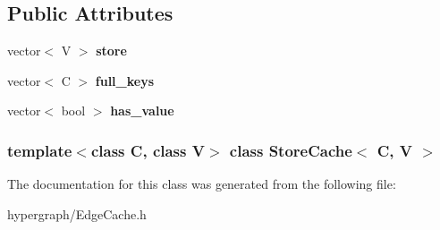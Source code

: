\subsection*{Public Attributes}
\begin{DoxyCompactItemize}
\item 
\hypertarget{class_store_cache_a99393733357e04fe79cf703d3f4d8f44}{
vector$<$ V $>$ {\bfseries store}}
\label{class_store_cache_a99393733357e04fe79cf703d3f4d8f44}

\item 
\hypertarget{class_store_cache_a0df08d5576ce34c4a8fd4f7428fd9ad3}{
vector$<$ C $>$ {\bfseries full\_\-keys}}
\label{class_store_cache_a0df08d5576ce34c4a8fd4f7428fd9ad3}

\item 
\hypertarget{class_store_cache_acdfad2c43fd63e37fbb818ce282f6493}{
vector$<$ bool $>$ {\bfseries has\_\-value}}
\label{class_store_cache_acdfad2c43fd63e37fbb818ce282f6493}

\end{DoxyCompactItemize}
\subsubsection*{template$<$class C, class V$>$ class StoreCache$<$ C, V $>$}



The documentation for this class was generated from the following file:\begin{DoxyCompactItemize}
\item 
hypergraph/EdgeCache.h\end{DoxyCompactItemize}
